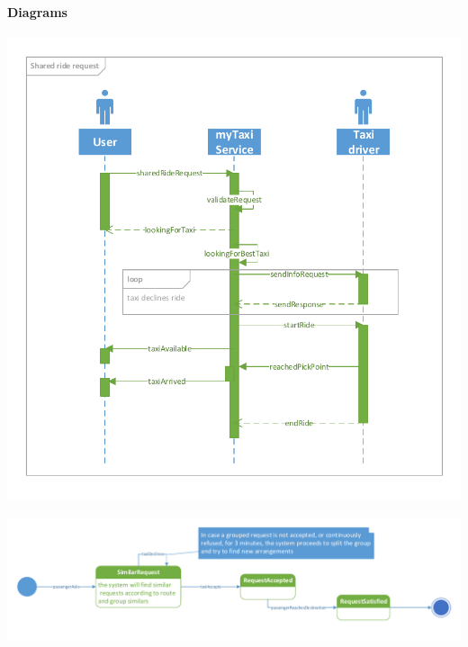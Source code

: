 	\paragraph{Diagrams}
	\begin{center}
	\includegraphics[width=\textwidth]{diagrams/shared_request}
\end{center}
\begin{center}
	\includegraphics[width=\textwidth]{diagrams/shared_state}
\end{center}
	
